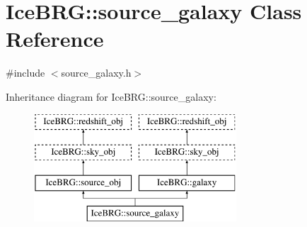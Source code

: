 \hypertarget{classIceBRG_1_1source__galaxy}{\section{Ice\-B\-R\-G\-:\-:source\-\_\-galaxy Class Reference}
\label{classIceBRG_1_1source__galaxy}
}


{\ttfamily \#include $<$source\-\_\-galaxy.\-h$>$}

Inheritance diagram for Ice\-B\-R\-G\-:\-:source\-\_\-galaxy\-:\begin{figure}[H]
\begin{center}
\leavevmode
\includegraphics[height=4.000000cm]{classIceBRG_1_1source__galaxy}
\end{center}
\end{figure}
